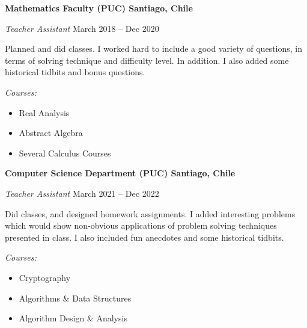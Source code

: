 \documentclass[../main.tex]{subfiles}
\begin{document}
    \textbf{Mathematics Faculty (PUC) \hfill  Santiago, Chile} \par
    \textit{Teacher Assistant} \hfill March 2018 -- Dec 2020 \par
    \vspace{5pt}
    \hspace*{1em}\begin{minipage}{\dimexpr\textwidth-4em}
        \noindent Planned and did classes. I worked hard to include a good variety of questions, in terms of solving technique and difficulty level. In addition. I also added some historical tidbits and bonus questions.\par
    \end{minipage}
    \vspace{5pt}\par
    \textit{Courses:}
    \begin{itemize}
        \item Real Analysis
        \item Abstract Algebra
        \item Several Calculus Courses
    \end{itemize} \par
    \textbf{Computer Science Department (PUC) \hfill  Santiago, Chile} \par
    \textit{Teacher Assistant} \hfill March 2021 -- Dec 2022 \par
    \vspace{5pt}
    \hspace*{1em}\begin{minipage}{\dimexpr\textwidth-4em}
        \noindent Did classes, and designed homework assignments. I added interesting problems which would show non-obvious applications of problem solving techniques presented in class. I also included fun anecdotes and some historical tidbits.\par
    \end{minipage}
    \vspace{5pt}\par
    \textit{Courses:}
    \begin{itemize}
        \item Cryptography
        \item Algorithms \& Data Structures
        \item Algorithm Design \& Analysis
    \end{itemize} \par
\end{document}
